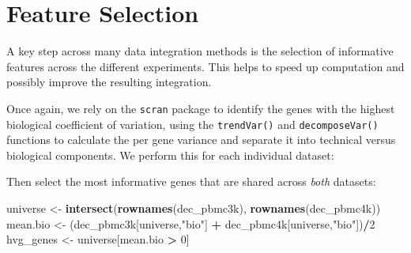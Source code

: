 \documentclass[]{book}
\newenvironment{Shaded}{\begin{snugshade}}{\end{snugshade}}
\newcommand{\DataTypeTok}[1]{\textcolor[rgb]{0.13,0.29,0.53}{#1}}
\newcommand{\DecValTok}[1]{\textcolor[rgb]{0.00,0.00,0.81}{#1}}
\newcommand{\KeywordTok}[1]{\textcolor[rgb]{0.13,0.29,0.53}{\textbf{#1}}}
\newcommand{\NormalTok}[1]{#1}
\newcommand{\OperatorTok}[1]{\textcolor[rgb]{0.81,0.36,0.00}{\textbf{#1}}}
\newcommand{\OtherTok}[1]{\textcolor[rgb]{0.56,0.35,0.01}{#1}}
\newcommand{\StringTok}[1]{\textcolor[rgb]{0.31,0.60,0.02}{#1}}
\begin{document}
\hypertarget{feature-selection}{%
\section{Feature Selection}\label{feature-selection}}

A key step across many data integration methods is the selection of informative features across the different experiments. This helps to speed up computation and possibly improve the resulting integration.

Once again, we rely on the \texttt{scran} package to identify the genes with the highest biological coefficient of variation, using the \texttt{trendVar()} and \texttt{decomposeVar()} functions to calculate the per gene variance and separate it into technical versus biological components. We perform this for each individual dataset:

\begin{Shaded}
\end{Shaded}

Then select the most informative genes that are shared across \emph{both} datasets:

\begin{Shaded}
\begin{Highlighting}[]
\NormalTok{universe <-}\StringTok{ }\KeywordTok{intersect}\NormalTok{(}\KeywordTok{rownames}\NormalTok{(dec_pbmc3k), }\KeywordTok{rownames}\NormalTok{(dec_pbmc4k))}
\NormalTok{mean.bio <-}\StringTok{ }\NormalTok{(dec_pbmc3k[universe,}\StringTok{"bio"}\NormalTok{] }\OperatorTok{+}\StringTok{ }\NormalTok{dec_pbmc4k[universe,}\StringTok{"bio"}\NormalTok{])}\OperatorTok{/}\DecValTok{2}
\NormalTok{hvg_genes <-}\StringTok{ }\NormalTok{universe[mean.bio }\OperatorTok{>}\StringTok{ }\DecValTok{0}\NormalTok{]}
\end{Highlighting}
\end{Shaded}
\end{document}
